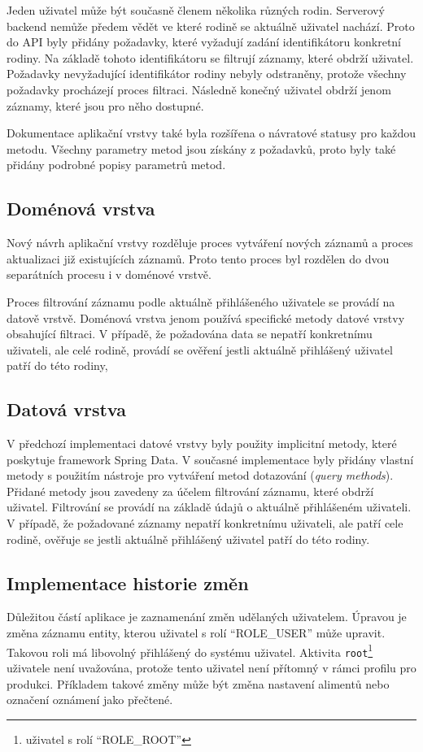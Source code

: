         
        Jeden uživatel může být současně členem několika různých rodin. Serverový backend nemůže předem vědět ve které rodině se aktuálně uživatel nachází. Proto do API byly přidány požadavky, které vyžadují zadání identifikátoru konkretní rodiny. Na základě tohoto identifikátoru se filtrují záznamy, které obdrží uživatel. Požadavky nevyžadující identifikátor rodiny nebyly odstraněny, protože všechny požadavky procházejí proces filtraci. Následně konečný uživatel obdrží jenom záznamy, které jsou pro něho dostupné.
        
        
        Dokumentace aplikační vrstvy také byla rozšířena o návratové statusy pro každou metodu. Všechny parametry metod jsou získány z požadavků, proto byly také přidány podrobné popisy parametrů metod. 
        
    \subsection{Doménová vrstva}%
        Nový návrh aplikační vrstvy rozděluje proces vytváření nových záznamů a proces aktualizaci již existujících záznamů. Proto tento proces byl rozdělen do dvou separátních procesu i v doménové vrstvě.
        
        
        Proces filtrování záznamu podle aktuálně přihlášeného uživatele se provádí na datově vrstvě. Doménová vrstva jenom používá specifické metody datové vrstvy obsahující filtraci. V případě, že požadována data se nepatří konkretnímu uživateli, ale celé rodině, provádí se ověření jestli aktuálně přihlášený uživatel patří do této rodiny,
        
    \subsection{Datová vrstva}
        V předchozí implementaci datové vrstvy byly použity implicitní metody, které poskytuje framework Spring Data. V současné implementace byly přidány vlastní metody s použitím nástroje pro vytváření metod dotazování (\textit{query methods}). Přidané metody jsou zavedeny za účelem filtrování záznamu, které obdrží uživatel. Filtrování se provádí na základě údajů o aktuálně přihlášeném uživateli. 
        V případě, že požadované záznamy nepatří konkretnímu uživateli, ale patří cele rodině, ověřuje se jestli aktuálně přihlášený uživatel patří do této rodiny.
    
    \subsection{Implementace historie změn}
        Důležitou částí aplikace je zaznamenání změn udělaných uživatelem. Úpravou je změna záznamu entity, kterou uživatel s rolí \enquote{ROLE\_USER} může upravit. Takovou roli má libovolný přihlášený do systému uživatel. Aktivita \texttt{root}\footnote{uživatel s rolí \enquote{ROLE\_ROOT}} uživatele není uvažována, protože tento uživatel není přítomný v rámci profilu pro produkci. Příkladem takové změny může být změna nastavení alimentů nebo označení oznámení jako přečtené.
    
